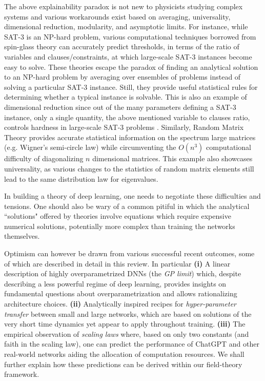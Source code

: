 The above explainability paradox is not new to physicists studying complex systems and various workarounds exist based on averaging, universality, dimensional reduction, modularity, and asymptotic limits. For instance, while SAT-3 is an NP-hard problem, various computational techniques borrowed from spin-glass theory can accurately predict thresholds, in terms of the ratio of variables and clauses/constraints, at which large-scale SAT-3 instances become easy to solve. These theories escape the paradox of finding an analytical solution to an NP-hard problem by averaging over ensembles of problems instead of solving a particular SAT-3 instance. Still, they provide useful statistical rules for determining whether a typical instance is solvable. This is also an example of dimensional reduction since out of the many parameters defining a SAT-3 instance, only a single quantity, the above mentioned variable to clauses ratio, controls hardness in large-scale SAT-3 problems \citep{MezardBook}. Similarly, Random Matrix Theory \citep{Potters_Bouchaud_2020} provides accurate statistical information on the spectrum large matrices (e.g. Wigner's semi-circle law) while circumventing the $O(n^3)$ computational difficulty of diagonalizing $n$ dimensional matrices. This example also showcases universality, as various changes to the statistics of random matrix elements still lead to the same distribution law for eigenvalues. 

In building a theory of deep learning, one needs to negotiate these difficulties and tensions. One should also be wary of a common pitiful in which the analytical ``solutions" offered by theories involve equations which require expensive numerical solutions, potentially more complex than training the networks themselves. 

Optimism can however be drawn from various successful recent outcomes, some of which are described in detail in this review. In particular {\bf (i)} A linear description of highly overparametrized DNNs (the {\it GP limit}) which, despite describing a less powerful regime of deep learning, provides insights on fundamental questions about overparametrization and allows rationalizing architecture choices. {\bf (ii)} Analytically inspired recipes for {\it hyper-parameter transfer} between small and large networks, which are based on solutions of the very short time dynamics yet appear to apply throughout training. {\bf (iii)} The empirical observation of {\it scaling laws} where, based on only two constants (and faith in the scaling law), one can predict the performance of ChatGPT and other real-world networks aiding the allocation of computation resources. We shall further explain how these predictions can be derived within our field-theory framework. 


